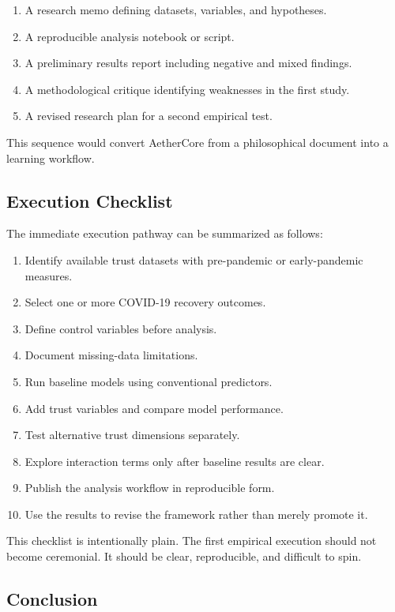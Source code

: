 \documentclass[12pt]{article}
\begin{document}
\begin{enumerate}
  \item A research memo defining datasets, variables, and hypotheses.
  \item A reproducible analysis notebook or script.
  \item A preliminary results report including negative and mixed findings.
  \item A methodological critique identifying weaknesses in the first study.
  \item A revised research plan for a second empirical test.
\end{enumerate}

This sequence would convert AetherCore from a philosophical document into a learning workflow.

\subsection{Execution Checklist}

The immediate execution pathway can be summarized as follows:

\begin{enumerate}
  \item Identify available trust datasets with pre-pandemic or early-pandemic measures.
  \item Select one or more COVID-19 recovery outcomes.
  \item Define control variables before analysis.
  \item Document missing-data limitations.
  \item Run baseline models using conventional predictors.
  \item Add trust variables and compare model performance.
  \item Test alternative trust dimensions separately.
  \item Explore interaction terms only after baseline results are clear.
  \item Publish the analysis workflow in reproducible form.
  \item Use the results to revise the framework rather than merely promote it.
\end{enumerate}

This checklist is intentionally plain. The first empirical execution should not become ceremonial. It should be clear, reproducible, and difficult to spin.

\subsection{Conclusion}
\end{document}
